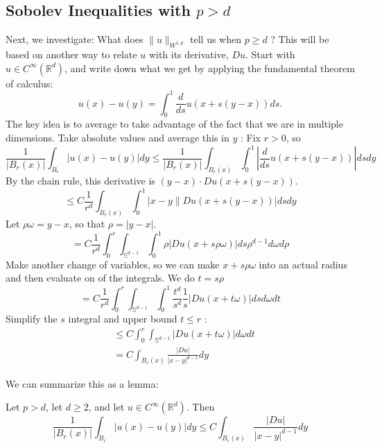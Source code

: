 \subsection{Sobolev Inequalities with $p>d$}
Next, we investigate: What does $\|u\|_{W^{1, p}}$ tell us when $p \geq d$ ? This will be based on another way to relate $u$ with its derivative, $D u$. Start with $u \in C^{\infty}\left(\mathbb{R}^{d}\right)$, and write down what we get by applying the fundamental theorem of calculus:
$$
u(x)-u(y)=\int_{0}^{1} \frac{d}{d s} u(x+s(y-x)) d s .
$$
The key idea is to average to take advantage of the fact that we are in multiple dimensions. Take absolute values and average this in $y$ : Fix $r>0$, so
$$
\frac{1}{\left|B_{r}(x)\right|} \int_{B_{r}}|u(x)-u(y)| d y \leq \frac{1}{\left|B_{r}(x)\right|} \int_{B_{r}(x)} \int_{0}^{1}\left|\frac{d}{d s} u(x+s(y-x))\right| d s d y
$$
By the chain rule, this derivative is $(y-x) \cdot D u(x+s(y-x))$.
$$
\leq C \frac{1}{r^{d}} \int_{B_{r}(x)} \int_{0}^{1}|x-y \| D u(x+s(y-x))| d s d y
$$
Let $\rho \omega=y-x$, so that $\rho=|y-x|$.
$$
=C \frac{1}{r^{d}} \int_{0}^{r} \int_{\mathbb{S}^{d-1}} \int_{0}^{1} \rho|D u(x+s \rho \omega)| d s \rho^{d-1} d \omega d \rho
$$
Make another change of variables, so we can make $x+s \rho \omega$ into an actual radius and then evaluate on of the integrals. We do $t=s \rho$
$$
=C \frac{1}{r^{d}} \int_{0}^{r} \int_{\mathbb{S}^{d-1}} \int_{0}^{1} \frac{t^{d}}{s^{d}} \frac{1}{s}|D u(x+t \omega)| d s d \omega d t
$$
Simplify the $s$ integral and upper bound $t \leq r$ :
$$
\begin{aligned}
&\leq C \int_{0}^{r} \int_{\mathbb{S}^{d-1}}|D u(x+t \omega)| d \omega d t \\
&=C \int_{B_{r}(x)} \frac{|D u|}{|x-y|^{d-1}} d y
\end{aligned}
$$

We can summarize this as a lemma: 
\begin{lemma}
    \label{lem: ball-ineq}
    Let $p>d$, let $d \geq 2$, and let $u \in C^{\infty}\left(\mathbb{R}^{d}\right)$. Then
    $$
    \frac{1}{\left|B_{r}(x)\right|} \int_{B_{r}}|u(x)-u(y)| d y \leq C \int_{B_{r}(x)} \frac{|D u|}{|x-y|^{d-1}} d y
    $$

\end{lemma}

